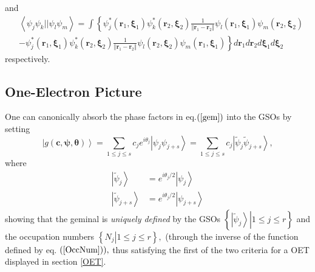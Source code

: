 \documentclass[aps,preprint]{revtex4}%
\begin{document}
and
\begin{align}
&  \left\langle \psi_{j}\psi_{k}||\psi_{l}\psi_{m}\right\rangle =\int\left\{
\psi_{j}^{\ast}\left(  \boldsymbol{r}_{1},\boldsymbol{\xi}_{1}\right)
\psi_{k}^{\ast}\left(  \boldsymbol{r}_{2},\boldsymbol{\xi}_{2}\right)
\frac{1}{\left\Vert \boldsymbol{r}_{1}-\boldsymbol{r}_{2}\right\Vert }\psi
_{l}\left(  \boldsymbol{r}_{1},\boldsymbol{\xi}_{1}\right)  \psi_{m}\left(
\boldsymbol{r}_{2},\boldsymbol{\xi}_{2}\right)  \right. \nonumber\\
&  -\left.  \psi_{j}^{\ast}\left(  \boldsymbol{r}_{1},\boldsymbol{\xi}%
_{1}\right)  \psi_{k}^{\ast}\left(  \boldsymbol{r}_{2},\boldsymbol{\xi}%
_{2}\right)  \frac{1}{\left\Vert \boldsymbol{r}_{1}-\boldsymbol{r}%
_{2}\right\Vert }\psi_{l}\left(  \boldsymbol{r}_{2},\boldsymbol{\xi}%
_{2}\right)  \psi_{m}\left(  \boldsymbol{r}_{1},\boldsymbol{\xi}_{1}\right)
\right\}  d\boldsymbol{r}_{1}d\boldsymbol{r}_{2}d\boldsymbol{\xi}%
_{1}d\boldsymbol{\xi}_{2} \label{H2}%
\end{align}
respectively.

\subsection{One-Electron Picture\label{OneElecPic}}

One can canonically absorb the phase factors in eq.$\left(  \ref{gem}\right)
$ into the GSOs by setting
\begin{equation}
\left\vert g\left(  \boldsymbol{c},\boldsymbol{\psi},\boldsymbol{\theta
}\right)  \right\rangle =\sum_{1\leq j\leq s}c_{j}e^{i\theta_{j}}\left\vert
\psi_{j}\psi_{j+s}\right\rangle =\sum_{1\leq j\leq s}c_{j}\left\vert
\tilde{\psi}_{j}\tilde{\psi}_{j+s}\right\rangle ,
\end{equation}
where
\begin{align}
\left\vert \tilde{\psi}_{j}\right\rangle  &  =e^{i\theta_{j}/2}\left\vert
\psi_{j}\right\rangle \nonumber\\
\left\vert \tilde{\psi}_{j+s}\right\rangle  &  =e^{i\theta_{j}/2}\left\vert
\psi_{j+s}\right\rangle
\end{align}
showing that the geminal is \emph{uniquely defined} by the GSOs $\left\{
\left.  \left\vert \tilde{\psi}_{j}\right\rangle \right\vert 1\leq j\leq
r\right\}  $ and the occupation numbers $\left\{  \left.  N_{j}\right\vert
1\leq j\leq r\right\}  ,$ (through the inverse of the function defined by eq.
$\left(  \ref{OccNum}\right)  ),$ thus satisfying the first of the two
criteria for a OET displayed in section \ref{OET}.
\end{document}
